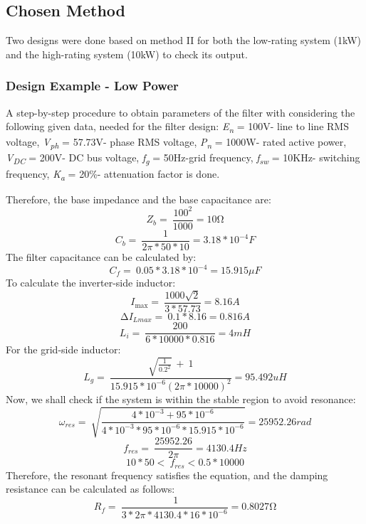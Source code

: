 \documentclass[12pt,a4paper]{book}
\begin{document}
\subsection{Chosen Method}
Two designs were done based on method II for both the low-rating system (1kW) and the high-rating system (10kW) to check its output.

\subsubsection{Design Example - Low Power}
A step-by-step procedure to obtain parameters of the filter with considering the following given data, needed for the filter design: \emph{E\textsubscript{n}} = 100V- line to line RMS voltage, \emph{V\textsubscript{ph}} = 57.73V- phase RMS voltage, \emph{P\textsubscript{n}} = 1000W- rated active power, \emph{V\textsubscript{DC}} = 200V- DC bus voltage, \emph{f\textsubscript{g}} = 50Hz-grid frequency, \emph{f\textsubscript{sw}} = 10KHz- switching frequency, \emph{K\textsubscript{a }}= 20\%- attenuation factor is done.

Therefore, the base impedance and the base capacitance are:
\[Z_{b} = \ \frac{100^{2}}{1000} = 10\mathrm{\Omega}\]
\[C_{b} = \ \frac{1}{2\pi*50*10} = 3.18*10^{- 4}F\]
The filter capacitance can be calculated by:
\[C_{f} = \ 0.05*3.18*10^{- 4} = 15.915\mu F\]
To calculate the inverter-side inductor:
\[I_{\max} = \ \frac{1000\sqrt{2}}{3*57.73} = 8.16A\]
\[{\mathrm{\Delta}I}_{Lmax} = \ 0.1*8.16 = 0.816A\]
\[L_{i} = \ \frac{200}{6*10000*0.816} = 4mH\]
For the grid-side inductor:
\[L_{g} = \ \frac{\sqrt{\frac{1}{{0.2}^{2}}}\  + \ 1}{15.915*10^{- 6}{(2\pi*10000)}^{2}} = 95.492uH\]
Now, we shall check if the system is within the stable region to avoid resonance:
\[\omega_{res} = \ \sqrt{\frac{4*10^{- 3} + 95*10^{- 6}}{4*10^{- 3}*95*10^{- 6}*15.915*10^{- 6}}} = 25952.26rad\]
\[f_{res} = \ \frac{25952.26}{2\pi} = 4130.4Hz\]
\[10*50 < \ f_{res} < 0.5*10000\]
Therefore, the resonant frequency satisfies the equation, and the damping resistance can be calculated as follows:
\[R_{f} = \ \frac{\ 1}{3*2\pi*4130.4*16*10^{- 6}} = 0.8027\mathrm{\Omega}\]

\end{document}
